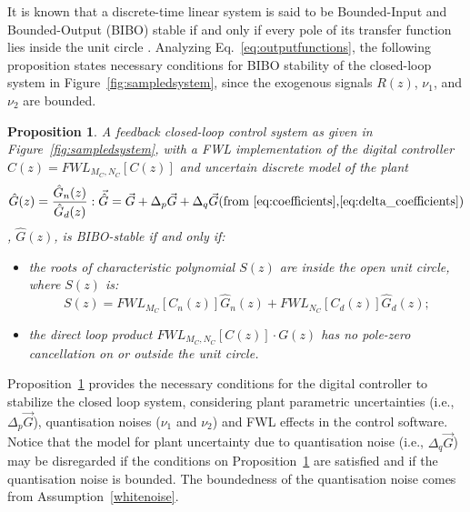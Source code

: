 \documentclass{sig-alternate-05-2015}
\newcommand{\red}[1]{{\color{red}#1}}
\newtheorem{myprop}{Proposition}
\begin{document}

It is known that a discrete-time linear system is said to be Bounded-Input and Bounded-Output
(BIBO) stable if and only if every pole of its transfer function lies inside
the unit circle \cite{Astrom08}.  Analyzing Eq.~\eqref{eq:outputfunctions}, the following
proposition states necessary conditions for BIBO stability of the closed-loop system
in Figure~\ref{fig:sampledsystem}, since the exogenous signals $R(z)$,
$\nu_{1}$, and $\nu_{2}$ are bounded.

\begin{myprop}{\cite{Bessa16,fadali}}
\label{prop:eq_int_stab} 
%
A feedback closed-loop control system as given in Figure~\ref{fig:sampledsystem},
with a FWL implementation of the digital controller $\hat{C}(z) =\mathit{FWL}_{M_C,N_C}[C(z)]$ and uncertain
discrete model of the plant 
$$\hat{G}(z) =\frac{\hat{G}_n(z)}{\hat{G}_d(z)}: \vec{\hat{G}}=\vec{G}+\Delta_p \vec{G}+\Delta_q
\vec{G} \text{(from  \ref{eq:coefficients},\ref{eq:delta_coefficients})}$$ ,  
$\hat{G}(z)$, is
BIBO-stable if and only if:
%
\begin{itemize}
\item  the roots of characteristic polynomial $S(z)$ are inside the open unit circle, where $S(z)$ is:
\begin{equation}
\label{eq:internal_stab_lemma}
S(z)=\mathit{FWL}_{M_C}[C_n(z)]\hat{G}_n(z)+\mathit{FWL}_{N_C}[C_d(z)]\hat{G}_d(z);
\end{equation}
\item the direct loop product $\mathit{FWL}_{M_C,N_C}[C(z)]\cdot G(z)$ has no pole-zero cancellation on or outside the unit circle.
\end{itemize}
\end{myprop}

Proposition~\ref{prop:eq_int_stab} provides the necessary conditions for the digital controller to stabilize the closed loop system, 
considering plant parametric uncertainties (i.e., $\Delta_p \vec{G}$),
quantisation noises ($\nu_{1}$ and $\nu_{2}$) and FWL effects in the control
software.  
Notice that the model for plant uncertainty due to quantisation noise (i.e., $\Delta_q \vec{G}$) may be disregarded if the conditions on
Proposition~\ref{prop:eq_int_stab} are satisfied and if the quantisation noise is
bounded.  The boundedness of the quantisation noise comes from Assumption~\ref{whitenoise}.

\end{document}
